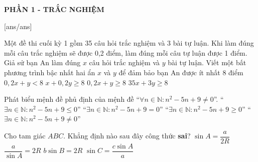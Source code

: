 


\begin{center}
	\textbf{PHẦN 1 - TRẮC NGHIỆM}
\end{center}
[ans/ans]
\setcounter{ex}{0}

\begin{ex}%
 Một đề thi cuối kỳ 1 gồm 35 câu hỏi trắc nghiệm và 3 bài tự luận. Khi làm đúng mỗi câu trắc
nghiệm sẽ được 0,2 điểm, làm đúng mỗi câu tự luận được 1 điểm. Giả sử bạn An làm đúng $x$ câu hỏi trắc
nghiệm và $y$ bài tự luận. Viết một bất phương trình bậc nhất hai ẩn $x$ và $y$ để đảm bảo bạn An được ít nhất $8$ điểm
\choice
{$0{,}2 x+y<8$}
{$x+0{,}2 y \geq 8$}
{\True $0{,}2 x+y \geq 8$}
{$35 x+3 y \geq 8$}
\end{ex}
\begin{ex}%
Phát biểu mệnh đề phủ định của mệnh đề ``$\forall n \in\mathbb{N} : n^2-5 n+9 \neq 0$''.
\choice
{``$\exists n \in\mathbb{N} : n^2-5 n+9 \leq 0$''}
{\True ``$\exists n \in\mathbb{N} : n^2-5 n+9=0$''}
{``$\exists n \in\mathbb{N} : n^2-5 n+9 \geq 0$''}
{``$\exists n \in\mathbb{N} : n^2-5 n+9 \neq 0$''}
\end{ex}
\begin{ex}%
Cho tam giác $ABC$. Khẳng định nào sau đây công thức \textbf{sai}?
\choice
{$\sin A=\dfrac{a}{2 R}$}
{$\dfrac{a}{\sin A}=2 R$}
{\True $b \sin B=2 R$}
{$\sin C=\dfrac{c \sin A}{a}$}
\end{ex}
